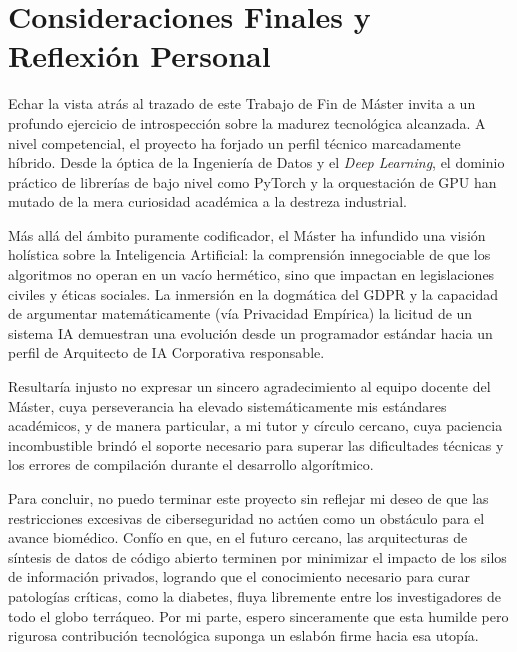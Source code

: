 \section{Consideraciones Finales y Reflexión Personal}

Echar la vista atrás al trazado de este Trabajo de Fin de Máster invita a un profundo ejercicio de introspección sobre la madurez tecnológica alcanzada. A nivel competencial, el proyecto ha forjado un perfil técnico marcadamente híbrido. Desde la óptica de la Ingeniería de Datos y el \textit{Deep Learning}, el dominio práctico de librerías de bajo nivel como PyTorch y la orquestación de GPU han mutado de la mera curiosidad académica a la destreza industrial.

Más allá del ámbito puramente codificador, el Máster ha infundido una visión holística sobre la Inteligencia Artificial: la comprensión innegociable de que los algoritmos no operan en un vacío hermético, sino que impactan en legislaciones civiles y éticas sociales. La inmersión en la dogmática del GDPR y la capacidad de argumentar matemáticamente (vía Privacidad Empírica) la licitud de un sistema IA demuestran una evolución desde un programador estándar hacia un perfil de Arquitecto de IA Corporativa responsable.

Resultaría injusto no expresar un sincero agradecimiento al equipo docente del Máster, cuya perseverancia ha elevado sistemáticamente mis estándares académicos, y de manera particular, a mi tutor y círculo cercano, cuya paciencia incombustible brindó el soporte necesario para superar las dificultades técnicas y los errores de compilación durante el desarrollo algorítmico.

\begin{citaLiteralAPA}
Para concluir, no puedo terminar este proyecto sin reflejar mi deseo de que las restricciones excesivas de ciberseguridad no actúen como un obstáculo para el avance biomédico. Confío en que, en el futuro cercano, las arquitecturas de síntesis de datos de código abierto terminen por minimizar el impacto de los silos de información privados, logrando que el conocimiento necesario para curar patologías críticas, como la diabetes, fluya libremente entre los investigadores de todo el globo terráqueo. Por mi parte, espero sinceramente que esta humilde pero rigurosa contribución tecnológica suponga un eslabón firme hacia esa utopía.
\end{citaLiteralAPA}
